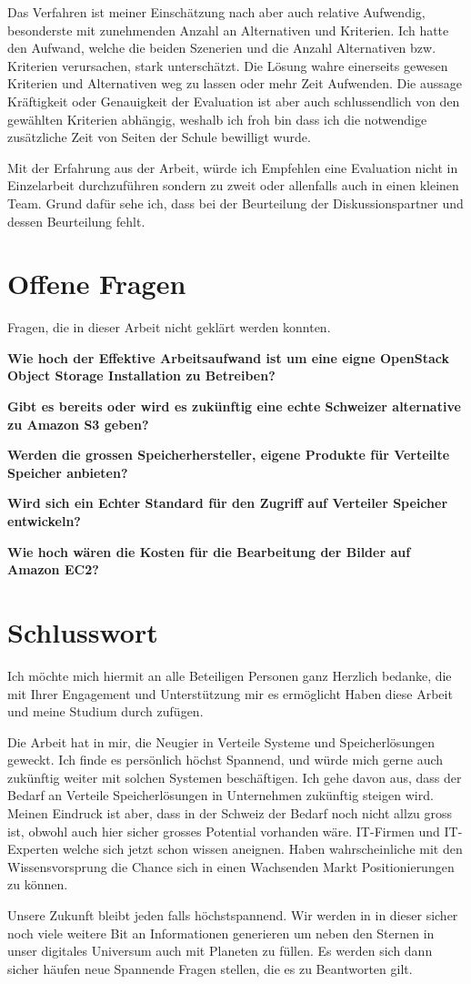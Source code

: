 Das Verfahren ist meiner Einschätzung nach aber auch relative Aufwendig, besonderste mit zunehmenden Anzahl an Alternativen und Kriterien. Ich hatte den Aufwand, welche die beiden Szenerien und die Anzahl Alternativen bzw. Kriterien verursachen, stark unterschätzt. Die Lösung wahre einerseits gewesen Kriterien und Alternativen weg zu lassen oder mehr Zeit Aufwenden. Die aussage Kräftigkeit oder Genauigkeit der Evaluation ist aber auch schlussendlich von den gewählten Kriterien abhängig, weshalb ich froh bin dass ich die notwendige zusätzliche Zeit von Seiten der Schule bewilligt wurde.

Mit der Erfahrung aus der Arbeit, würde ich Empfehlen eine Evaluation nicht in Einzelarbeit durchzuführen sondern zu zweit oder allenfalls auch in einen kleinen Team. Grund dafür sehe ich, dass bei der Beurteilung der Diskussionspartner und dessen Beurteilung fehlt.

\section{Offene Fragen}

Fragen, die in dieser Arbeit nicht geklärt werden konnten.

\textbf{Wie hoch der Effektive Arbeitsaufwand ist um eine eigne OpenStack Object Storage Installation zu Betreiben?}

\textbf{Gibt es bereits oder wird es zukünftig eine echte Schweizer alternative zu Amazon S3 geben?}

\textbf{Werden die grossen Speicherhersteller, eigene Produkte für Verteilte Speicher anbieten?}

\textbf{Wird sich ein Echter Standard für den Zugriff auf Verteiler Speicher entwickeln?}

\textbf{Wie hoch wären die Kosten für die Bearbeitung der Bilder auf Amazon EC2?}


\section{Schlusswort}
Ich möchte mich hiermit an alle Beteiligen Personen ganz Herzlich bedanke, die mit Ihrer Engagement und Unterstützung mir es ermöglicht Haben diese Arbeit und meine Studium durch zufügen. 

Die Arbeit hat in mir, die Neugier in Verteile Systeme und Speicherlösungen geweckt. Ich finde es persönlich höchst Spannend, und würde mich gerne auch zukünftig weiter mit solchen Systemen beschäftigen. Ich gehe davon aus, dass der Bedarf an Verteile Speicherlösungen in Unternehmen zukünftig steigen wird. Meinen Eindruck ist aber, dass in der Schweiz der Bedarf noch nicht allzu gross ist, obwohl auch hier sicher grosses Potential vorhanden wäre. IT-Firmen und IT-Experten welche sich jetzt schon wissen aneignen. Haben wahrscheinliche mit den Wissensvorsprung die Chance sich in einen Wachsenden Markt Positionierungen zu können. 

Unsere Zukunft bleibt jeden falls höchstspannend. Wir werden in in dieser sicher noch viele weitere Bit an Informationen generieren um neben den Sternen in unser digitales Universum auch mit Planeten zu füllen. Es werden sich dann sicher häufen neue Spannende Fragen stellen, die es zu Beantworten gilt.
